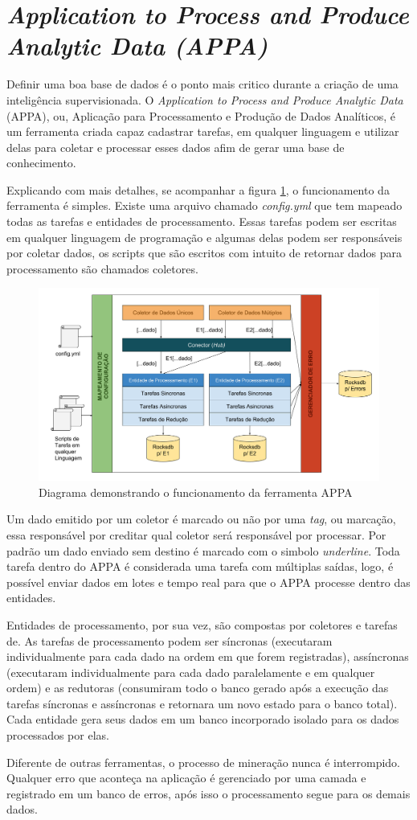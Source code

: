 \section{\textit{Application to Process and Produce Analytic Data (APPA)}}

Definir uma boa base de dados é o ponto mais critico durante a criação de uma inteligência supervisionada. O \textit{Application to Process and Produce Analytic Data} (APPA), ou, Aplicação para Processamento e Produção de Dados Analíticos, é um ferramenta criada capaz cadastrar tarefas, em qualquer linguagem e utilizar delas para coletar e processar esses dados afim de gerar uma base de conhecimento.

Explicando com mais detalhes, se acompanhar a figura \ref{fig:appa_eng}, o funcionamento da ferramenta é simples. Existe uma arquivo chamado \textit{config.yml} que tem mapeado todas as tarefas e entidades de processamento. Essas tarefas podem ser escritas em qualquer linguagem de programação e algumas delas podem ser responsáveis por coletar dados, os scripts que são escritos com intuito de retornar dados para processamento são chamados coletores.

\begin{figure}[H]
    \centering
    \includegraphics[width=.8\textwidth]{imagens/appa_eng.png}
    \caption{Diagrama demonstrando o funcionamento da ferramenta APPA}
    \label{fig:appa_eng}
\end{figure}

Um dado emitido por um coletor é marcado ou não por uma \textit{tag}, ou marcação, essa responsável por creditar qual coletor será responsável por processar. Por padrão um dado enviado sem destino é marcado com o simbolo \textit{underline}. Toda tarefa dentro do APPA é considerada uma tarefa com múltiplas saídas, logo, é possível enviar dados em lotes e tempo real para que o APPA processe dentro das entidades. 

Entidades de processamento, por sua vez, são compostas por coletores e tarefas de. As tarefas de processamento podem ser síncronas (executaram individualmente para cada dado na ordem em que forem registradas), assíncronas (executaram individualmente para cada dado paralelamente e em qualquer ordem) e as redutoras (consumiram todo o banco gerado após a execução das tarefas síncronas e assíncronas e retornara um novo estado para o banco total). Cada entidade gera seus dados em um banco incorporado isolado para os dados processados por elas.

Diferente de outras ferramentas, o processo de mineração nunca é interrompido. Qualquer erro que aconteça na aplicação é gerenciado por uma camada e registrado em um banco de erros, após isso o processamento segue para os demais dados.

